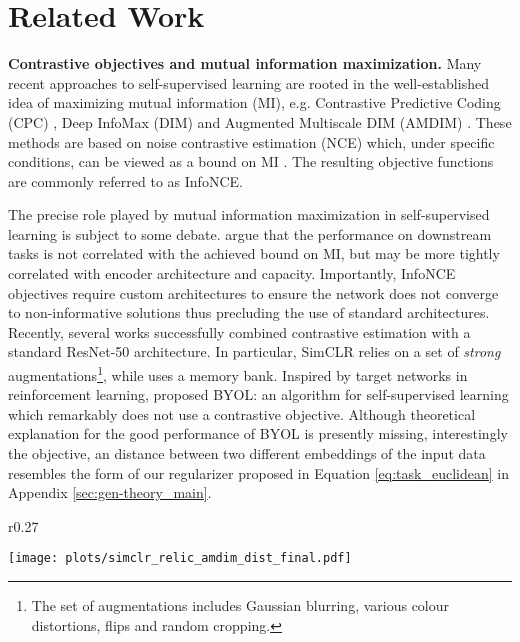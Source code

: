 \documentclass{article}
\newcommand{\relic}{\textsc{ReLIC}}
\begin{document}
 \section{Related Work} \label{sec:related}

{\bf Contrastive objectives and mutual information maximization.}
Many recent approaches to self-supervised learning are rooted in the well-established idea of maximizing mutual information (MI), e.g. Contrastive Predictive Coding (CPC) \citep{oord2018representation, henaff2019data}, Deep InfoMax (DIM) \citep{hjelm2018learning} and Augmented Multiscale DIM (AMDIM) \citep{bachman2019learning}. These methods are based on noise contrastive estimation (NCE) \citep{gutmann2010noise} which, under specific conditions, can be viewed as a bound on MI \citep{poole2019variational}. The resulting objective functions are commonly referred to as InfoNCE.

The precise role played by mutual information maximization in self-supervised learning is subject to some debate. \citep{tschannen2019mutual} argue that the performance on downstream tasks is not correlated with the achieved bound on MI, but may be more tightly correlated with encoder architecture and capacity. 
Importantly, InfoNCE objectives require custom architectures to ensure the network does not converge to non-informative solutions thus precluding the use of standard architectures. 
Recently, several works \citep{he2019momentum, chen2020simple} successfully combined contrastive estimation with a standard ResNet-50 architecture.
In particular, SimCLR \citep{chen2020simple} relies on a set of \emph{strong} augmentations\footnote{The set of augmentations includes Gaussian blurring, various colour distortions, flips and random cropping.}, while \citep{he2019momentum} uses a memory bank. Inspired by target networks in reinforcement learning, \citep{grill2020bootstrap} proposed BYOL: an algorithm for self-supervised learning which remarkably does not use a contrastive objective. Although theoretical explanation for the good performance of BYOL is presently missing, interestingly the objective, an  distance between two different embeddings of the input data resembles the  form of our regularizer proposed in Equation \ref{eq:task_euclidean} in Appendix \ref{sec:gen-theory_main}. 

\begin{wrapfigure}{r}{0.27\textwidth}
\vspace{-0.5cm}
  \begin{center}
    \texttt{[image: plots/simclr\_relic\_amdim\_dist\_final.pdf]}
  \end{center}
    \caption{Distribution of the linear discriminant ratio (, see text) of  for \relic{}, SimCLR and AMDIM (-axis clipped to aid visualization). \label{fig:distances}}  
  \vspace{-0.3cm}
\end{wrapfigure}
\end{document}
